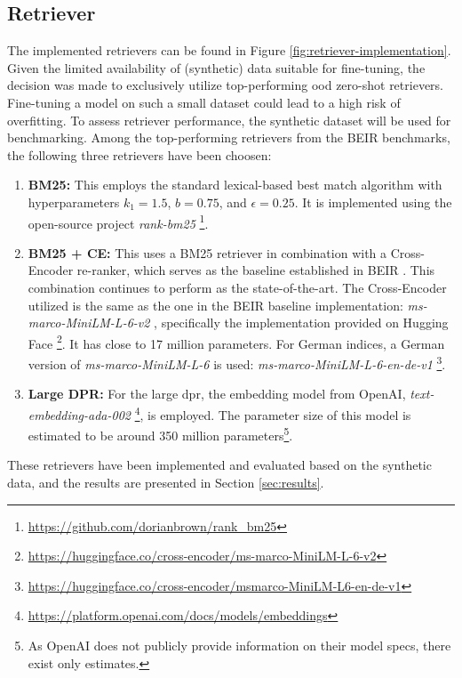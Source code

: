 \subsection{Retriever}
\label{subsec:retriever-impl}

The implemented retrievers can be found in Figure \ref{fig:retriever-implementation}. Given the limited availability of (synthetic) data suitable for fine-tuning, the decision was made to exclusively utilize top-performing \gls{ood} zero-shot retrievers. Fine-tuning a model on such a small dataset could lead to a high risk of overfitting. To assess retriever performance, the synthetic dataset will be used for benchmarking. Among the top-performing retrievers from the BEIR benchmarks, the following three retrievers have been choosen:

\begin{enumerate}
    \item \textbf{BM25:} This employs the standard lexical-based best match algorithm with hyperparameters $k_1=1.5$, $b=0.75$, and $\epsilon=0.25$. It is implemented using the open-source project \textit{rank-bm25} \footnote{\url{https://github.com/dorianbrown/rank_bm25}}.
    \item \textbf{BM25 + CE:} This uses a BM25 retriever in combination with a Cross-Encoder re-ranker, which serves as the baseline established in BEIR \cite{thakur_beir_2021}. This combination continues to perform as the state-of-the-art. The Cross-Encoder utilized is the same as the one in the BEIR baseline implementation: \textit{ms-marco-MiniLM-L-6-v2} \cite{wang_minilm_2020}, specifically the implementation provided on Hugging Face \footnote{\url{https://huggingface.co/cross-encoder/ms-marco-MiniLM-L-6-v2}}. It has close to 17 million parameters. For German indices, a German version of \textit{ms-marco-MiniLM-L-6} is used: \textit{ms-marco-MiniLM-L-6-en-de-v1} \footnote{\url{https://huggingface.co/cross-encoder/msmarco-MiniLM-L6-en-de-v1}}.
    \item \textbf{Large DPR:} For the large \gls{dpr}, the embedding model from OpenAI, \textit{text-embedding-ada-002} \footnote{\url{https://platform.openai.com/docs/models/embeddings}}, is employed. The parameter size of this model is estimated to be around 350 million parameters\cite{muennighoff_sgpt_2022}\footnote{As OpenAI does not publicly provide information on their model specs, there exist only estimates.}.
\end{enumerate}

These retrievers have been implemented and evaluated based on the synthetic data, and the results are presented in Section \ref{sec:results}.

